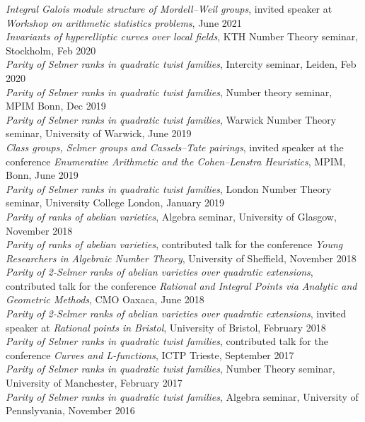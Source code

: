 \documentclass{res}
\begin{document}
\begin{resume}
{\it  Integral Galois module structure of Mordell--Weil groups}, invited speaker at {\it Workshop on arithmetic statistics problems}, June 2021   \medskip  \\
{\it  Invariants of hyperelliptic curves over local fields}, KTH Number Theory seminar, Stockholm, Feb 2020  \vspace{-0.18in} \medskip  \\
{\it Parity of Selmer ranks in quadratic twist families}, Intercity seminar, Leiden, Feb 2020 \medskip \\
{\it Parity of Selmer ranks in quadratic twist families}, Number theory seminar, MPIM Bonn, Dec 2019 \medskip \\
{\it Parity of Selmer ranks in quadratic twist families}, Warwick Number Theory seminar, University of Warwick, June 2019 \medskip \\
{\it Class groups, Selmer groups and Cassels--Tate pairings}, invited speaker at the conference {\it Enumerative Arithmetic and the Cohen–Lenstra Heuristics}, MPIM, Bonn, June 2019 \medskip \\
{\it Parity of Selmer ranks in quadratic twist families}, London Number Theory seminar, University College London, January 2019  \medskip \\
{\it Parity of ranks of abelian varieties}, Algebra seminar, University of Glasgow, November 2018  \medskip \\
{\it Parity of ranks of abelian varieties},  contributed talk for the conference {\it Young Researchers in Algebraic Number Theory}, University of Sheffield, November 2018  \medskip \\
{\it Parity of 2-Selmer ranks of abelian varieties over quadratic extensions},  contributed talk for the conference {\it Rational and Integral Points via Analytic and Geometric Methods}, CMO Oaxaca, June 2018  \medskip \\
{\it Parity of 2-Selmer ranks of abelian varieties over quadratic extensions}, invited speaker at {\it Rational points in Bristol}, University of Bristol, February 2018  \medskip \\
{\it Parity of Selmer ranks in quadratic twist families}, contributed talk for the conference {\it Curves and L-functions}, ICTP Trieste, September 2017  \medskip \\
{\it Parity of Selmer ranks in quadratic twist families}, Number Theory seminar, University of Manchester, February 2017  \medskip \\
{\it Parity of Selmer ranks in quadratic twist families}, Algebra seminar, University of Pennslyvania, November 2016  \medskip \\

\end{resume}
\end{document}
